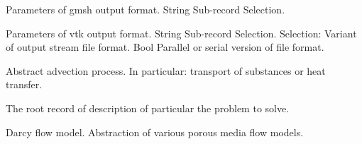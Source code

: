 \begin{RecordType}
	{}
	{} %
	{} %
	{} %
	{{{Parameters of gmsh output format.}}}
		\KeyItem
			{}
			{{String}}
			{\textrangle}
			{} %
			{{{Sub-record Selection.}}}
\end{RecordType}
\begin{RecordType}
	{}
	{} %
	{} %
	{} %
	{{{Parameters of vtk output format.}}}
		\KeyItem
			{}
			{{String}}
			{\textrangle}
			{} %
			{{{Sub-record Selection.}}}
		\KeyItem
			{}
			{{Selection}{: }}
			{\textrangle}
			{} %
			{{{Variant of output stream file format.}}}
		\KeyItem
			{}
			{{Bool}}
			{\textrangle}
			{} %
			{{{Parallel or serial version of file format.}}}
\end{RecordType}
\begin{AbstractType}
	{}
	{}{}
	{{{Abstract advection process. In particular: transport of substances or heat transfer.}}}
\end{AbstractType}
\begin{AbstractType}
	{}
	{}{}
	{{{The root record of description of particular the problem to solve.}}}
\end{AbstractType}
\begin{AbstractType}
	{}
	{}{}
	{{{Darcy flow model. Abstraction of various porous media flow models.}}}
\end{AbstractType}
